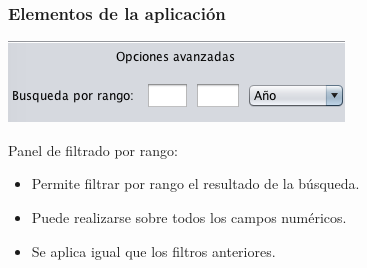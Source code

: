 \documentclass{beamer} %
\begin{document}
\begin{frame}
	\frametitle{Elementos de la aplicación}
	\begin{center}
		\includegraphics[scale=0.45]{Img/Img12.png}
	\end{center}
	Panel de filtrado por rango:
	\begin{itemize}
		\item Permite filtrar por rango el resultado de la búsqueda.
		\item Puede realizarse sobre todos los campos numéricos.
		\item Se aplica igual que los filtros anteriores.
	\end{itemize}	
\end{frame}
       
\end{document}

